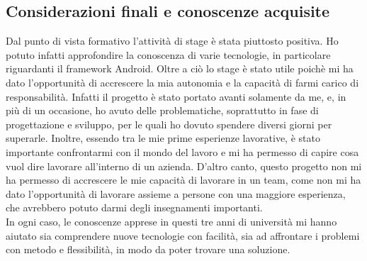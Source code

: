 \documentclass[../Tesi.tex]{subfiles}
\begin{document}
	\subsection{Considerazioni finali e conoscenze acquisite}
	Dal punto di vista formativo l'attività di stage è stata piuttosto positiva. Ho potuto infatti approfondire la conoscenza di varie tecnologie, in particolare riguardanti il framework Android. Oltre a ciò lo stage è stato utile poichè mi ha dato l'opportunità di accrescere la mia autonomia e la capacità di farmi carico di responsabilità. Infatti il progetto è stato portato avanti solamente da me, e, in più di un occasione, ho avuto delle problematiche, soprattutto in fase di progettazione e sviluppo, per le quali ho dovuto spendere diversi giorni per superarle. Inoltre, essendo tra le mie prime esperienze lavorative, è stato importante confrontarmi con il mondo del lavoro e mi ha permesso di capire cosa vuol dire lavorare all'interno di un azienda. D'altro canto, questo progetto non mi ha permesso di accrescere le mie capacità di lavorare in un team, come non mi ha dato l'opportunità di lavorare assieme a persone con una maggiore esperienza, che avrebbero potuto darmi degli insegnamenti importanti.\\
	In ogni caso, le conoscenze apprese in questi tre anni di università mi hanno aiutato sia comprendere nuove tecnologie con facilità, sia ad affrontare i problemi con metodo e flessibilità, in modo da poter trovare una soluzione. 
\end{document}
